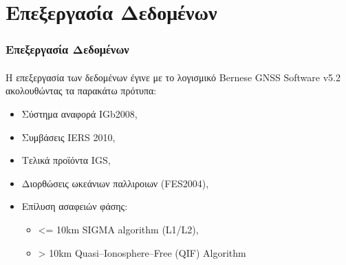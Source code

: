 \documentclass{beamer}
\begin{document}
\section{Επεξεργασία Δεδομένων}

\begin{frame}\frametitle{Επεξεργασία Δεδομένων}\framesubtitle{}
Η επεξεργασία των δεδομένων έγινε με το λογισμικό Bernese GNSS Software v5.2 ακολουθώντας τα παρακάτω πρότυπα:
\begin{itemize}
	\item Σύστημα αναφορά IGb2008,
	\item Συμβάσεις IERS 2010,
	\item Τελικά προϊόντα IGS,
	\item Διορθώσεις ωκεάνιων παλλιροιων (FES2004),
	\item Επίλυση ασαφειών φάσης:
	\begin{itemize}
		\item {<=} 10km SIGMA algorithm (L1/L2),
		\item {>}  10km Quasi–Ionosphere–Free (QIF) Algorithm
	\end{itemize}
% 
\end{itemize}
\end{frame}
\end{document}
